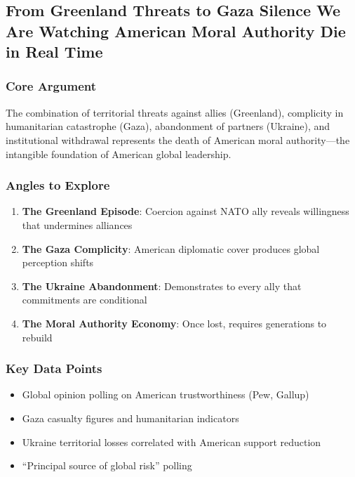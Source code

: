 \documentclass[11pt,letterpaper]{article}
\begin{document}
\newpage
\subsection{From Greenland Threats to Gaza Silence We Are Watching American Moral Authority Die in Real Time}

\subsubsection*{Core Argument}
The combination of territorial threats against allies (Greenland), complicity in humanitarian catastrophe (Gaza), abandonment of partners (Ukraine), and institutional withdrawal represents the death of American moral authority---the intangible foundation of American global leadership.

\subsubsection*{Angles to Explore}
\begin{enumerate}[noitemsep]
    \item \textbf{The Greenland Episode}: Coercion against NATO ally reveals willingness that undermines alliances
    \item \textbf{The Gaza Complicity}: American diplomatic cover produces global perception shifts
    \item \textbf{The Ukraine Abandonment}: Demonstrates to every ally that commitments are conditional
    \item \textbf{The Moral Authority Economy}: Once lost, requires generations to rebuild
\end{enumerate}

\subsubsection*{Key Data Points}
\begin{itemize}[noitemsep]
    \item Global opinion polling on American trustworthiness (Pew, Gallup)
    \item Gaza casualty figures and humanitarian indicators
    \item Ukraine territorial losses correlated with American support reduction
    \item ``Principal source of global risk'' polling
\end{itemize}
\end{document}
